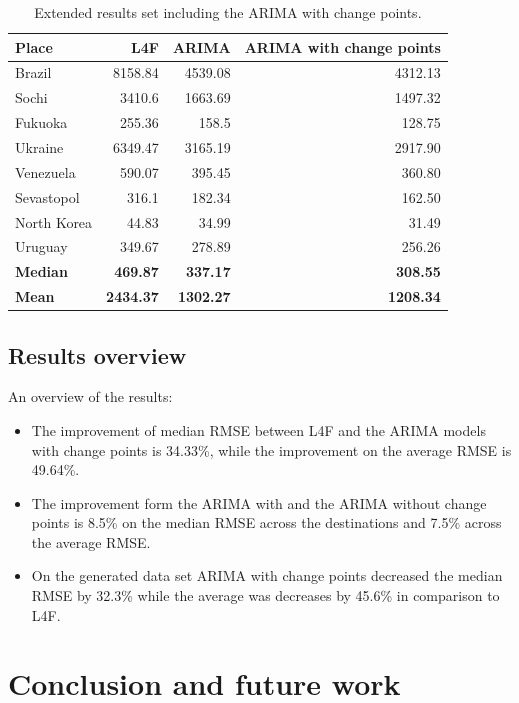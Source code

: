 \documentclass[minf,twoside,singlespacing,parskip,frontabs,notimes,12pt]{infthesis} %
\begin{document}
\begin{table}[h]
\begin{center}
\begin{tabular}{ l | r | r | r } 
Place & L4F & ARIMA & ARIMA with change points\\
\hline
Brazil	&	8158.84	&	4539.08	&	4312.13 \\
Sochi	&	3410.6	&	1663.69	&	1497.32 \\
Fukuoka	&	255.36	&	158.5	&	128.75 \\
Ukraine	&	6349.47	&	3165.19	&	2917.90 \\
Venezuela	&	590.07	&	395.45	&	360.80 \\
Sevastopol	&	316.1	&	182.34	&	162.50 \\
North Korea	&	44.83	&	34.99	&	31.49 \\
Uruguay	&	349.67	&	278.89	&	256.26 \\
\hline
\textbf{Median} & \textbf{469.87} & \textbf{337.17}  & \textbf{308.55}\\
\hline
\textbf{Mean} & \textbf{2434.37} & \textbf{1302.27} & \textbf{1208.34}\\
\end{tabular}
\end{center}
\caption{Extended results set including the ARIMA with change points.}
\label{comparison-results-v2}
\end{table}

\section{Results overview}
An overview of the results:
\begin{itemize}
\item The improvement of median RMSE between L4F and the ARIMA models with change points is 34.33\%, while the improvement on the average RMSE is 49.64\%. 
\item The improvement form the ARIMA with and the ARIMA without change points is 8.5\% on the median RMSE across the destinations and 7.5\% across the average RMSE. 
\item On the generated data set ARIMA with change points decreased the median RMSE by 32.3\% while the average was decreases by 45.6\% in comparison to L4F.
\end{itemize}


\chapter{Conclusion and future work}
\end{document}
